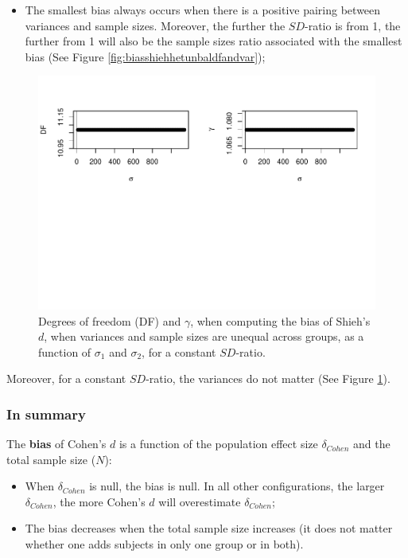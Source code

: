 \documentclass[
  english,
  man,mask]{apa6}
\providecommand{\tightlist}{%
  \setlength{\itemsep}{0pt}\setlength{\parskip}{0pt}}
\begin{document}
\begin{itemize}
\tightlist
\item
  The smallest bias always occurs when there is a positive pairing between variances and sample sizes. Moreover, the further the \(SD\)-ratio is from 1, the further from 1 will also be the sample sizes ratio associated with the smallest bias (See Figure \ref{fig:biasshiehhetunbaldfandvar});
\end{itemize}

\begin{figure}
\centering
\includegraphics{SupMat1_files/figure-latex/biasshiehhetunbalvariance2-1.pdf}
\caption{\label{fig:biasshiehhetunbalvariance2}Degrees of freedom (DF) and \(\gamma\), when computing the bias of Shieh's \(d\), when variances and sample sizes are unequal across groups, as a function of \(\sigma_1\) and \(\sigma_2\), for a constant \(SD\)-ratio.}
\end{figure}

Moreover, for a constant \(SD\)-ratio, the variances do not matter (See Figure \ref{fig:biasshiehhetunbalvariance2}).

\hypertarget{in-summary}{%
\subsubsection{In summary}\label{in-summary}}

The \textbf{bias} of Cohen's \(d\) is a function of the population effect size \(\delta_{Cohen}\) and the total sample size (\(N\)):

\begin{itemize}
\tightlist
\item
  When \(\delta_{Cohen}\) is null, the bias is null. In all other configurations, the larger \(\delta_{Cohen}\), the more Cohen's \(d\) will overestimate \(\delta_{Cohen}\);\\
\item
  The bias decreases when the total sample size increases (it does not matter whether one adds subjects in only one group or in both).
\end{itemize}
\end{document}
